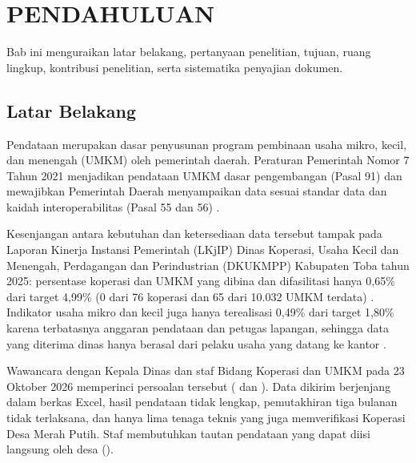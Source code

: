 
\chapter{PENDAHULUAN}
\label{bab:pendahuluan}
\label{chap:pendahuluan}

Bab ini menguraikan latar belakang, pertanyaan penelitian, tujuan, ruang lingkup, kontribusi penelitian, serta sistematika penyajian dokumen.

\section{Latar Belakang}
\label{sec:latar-belakang}

Pendataan merupakan dasar penyusunan program pembinaan usaha mikro, kecil, dan menengah (UMKM) oleh pemerintah daerah. Peraturan Pemerintah Nomor 7 Tahun 2021 menjadikan pendataan UMKM dasar pengembangan (Pasal 91) dan mewajibkan Pemerintah Daerah menyampaikan data sesuai standar data dan kaidah interoperabilitas (Pasal 55 dan 56) \cite{pp7tahun2021}.

Kesenjangan antara kebutuhan dan ketersediaan data tersebut tampak pada Laporan Kinerja Instansi Pemerintah (LKjIP) Dinas Koperasi, Usaha Kecil dan Menengah, Perdagangan dan Perindustrian (DKUKMPP) Kabupaten Toba tahun 2025: persentase koperasi dan UMKM yang dibina dan difasilitasi hanya 0,65\% dari target 4,99\% (0 dari 76 koperasi dan 65 dari 10.032 UMKM terdata) \cite[hlm.~50]{lkjip2025toba}. Indikator usaha mikro dan kecil juga hanya terealisasi 0,49\% dari target 1,80\% karena terbatasnya anggaran pendataan dan petugas lapangan, sehingga data yang diterima dinas hanya berasal dari pelaku usaha yang datang ke kantor \cite[hlm.~107]{lkjip2025toba}.

Wawancara dengan Kepala Dinas dan staf Bidang Koperasi dan UMKM pada 23 Oktober 2026 memperinci persoalan tersebut (\lampkadis{} dan \lampstaf). Data dikirim berjenjang dalam berkas Excel, hasil pendataan tidak lengkap, pemutakhiran tiga bulanan tidak terlaksana, dan hanya lima tenaga teknis yang juga memverifikasi Koperasi Desa Merah Putih. Staf membutuhkan tautan pendataan yang dapat diisi langsung oleh desa (\lampstaf).

